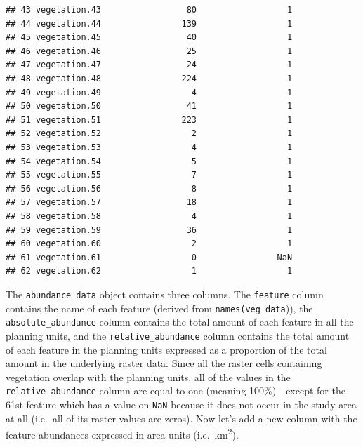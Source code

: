 \documentclass[12pt,]{book}
\newenvironment{Shaded}{\begin{snugshade}}{\end{snugshade}}
\newcommand{\KeywordTok}[1]{\textcolor[rgb]{0.13,0.29,0.53}{\textbf{#1}}}
\newcommand{\DecValTok}[1]{\textcolor[rgb]{0.00,0.00,0.81}{#1}}
\newcommand{\StringTok}[1]{\textcolor[rgb]{0.31,0.60,0.02}{#1}}
\newcommand{\CommentTok}[1]{\textcolor[rgb]{0.56,0.35,0.01}{\textit{#1}}}
\newcommand{\OperatorTok}[1]{\textcolor[rgb]{0.81,0.36,0.00}{\textbf{#1}}}
\newcommand{\NormalTok}[1]{#1}
\begin{document}
\begin{verbatim}
## 43 vegetation.43                 80                  1
## 44 vegetation.44                139                  1
## 45 vegetation.45                 40                  1
## 46 vegetation.46                 25                  1
## 47 vegetation.47                 24                  1
## 48 vegetation.48                224                  1
## 49 vegetation.49                  4                  1
## 50 vegetation.50                 41                  1
## 51 vegetation.51                223                  1
## 52 vegetation.52                  2                  1
## 53 vegetation.53                  4                  1
## 54 vegetation.54                  5                  1
## 55 vegetation.55                  7                  1
## 56 vegetation.56                  8                  1
## 57 vegetation.57                 18                  1
## 58 vegetation.58                  4                  1
## 59 vegetation.59                 36                  1
## 60 vegetation.60                  2                  1
## 61 vegetation.61                  0                NaN
## 62 vegetation.62                  1                  1
\end{verbatim}

The \texttt{abundance\_data} object contains three columns. The
\texttt{feature} column contains the name of each feature (derived from
\texttt{names(veg\_data})), the \texttt{absolute\_abundance} column
contains the total amount of each feature in all the planning units, and
the \texttt{relative\_abundance} column contains the total amount of
each feature in the planning units expressed as a proportion of the
total amount in the underlying raster data. Since all the raster cells
containing vegetation overlap with the planning units, all of the values
in the \texttt{relative\_abundance} column are equal to one (meaning
100\%)---except for the 61st feature which has a value on \texttt{NaN}
because it does not occur in the study area at all (i.e.~all of its
raster values are zeros). Now let's add a new column with the feature
abundances expressed in area units (i.e.~km\textsuperscript{2}).

\begin{Shaded}
\end{Shaded}
\end{document}

